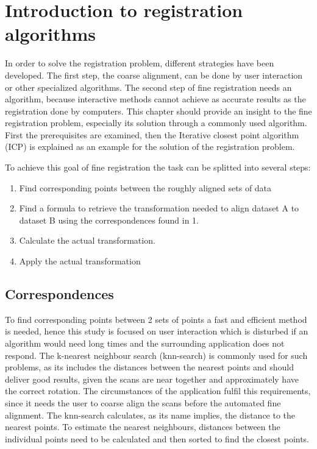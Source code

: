 \documentclass[hyperref,english,bachelorofscience,bibnum,twoside]{cgvpub}
\begin{document}
\section{Introduction to registration algorithms} \label{sec:Itra}

In order to solve the registration problem, different strategies have been developed. The first step, the coarse alignment, can be done by user interaction or other specialized algorithms. The second step of fine registration needs an algorithm, because interactive methods cannot achieve as accurate results as the registration done by computers. This chapter should provide an insight to the fine registration problem, especially its solution through a commonly used algorithm. First the prerequisites are examined, then the Iterative closest point algorithm (ICP) is explained as an example for the solution of the registration problem.

To achieve this goal of fine registration the task can be splitted into several steps:
\begin{enumerate}
\item  Find corresponding points between the roughly aligned sets of data
\item  Find a formula to retrieve the transformation needed to align dataset A to dataset B using the correspondences found in 1.
\item Calculate the actual transformation.
\item Apply the actual transformation
\end{enumerate}

\subsection{Correspondences}

To find corresponding points between 2 sets of points a fast and efficient method is needed, hence this study is focused on user interaction which is disturbed if an algorithm would need long times and the surrounding application does not respond.
The k-nearest neighbour search (knn-search) is commonly used for such problems, as its includes the distances between the nearest points and should deliver good results, given the scans are near together and approximately have the correct rotation. The circumstances of the application fulfil this requirements, since it needs the user to coarse align the scans before the automated fine alignment.
The knn-search calculates, as its name implies, the distance to the nearest points. To estimate the nearest neighbours, distances between the individual points need to be calculated and then sorted to find the closest points.
\end{document}
